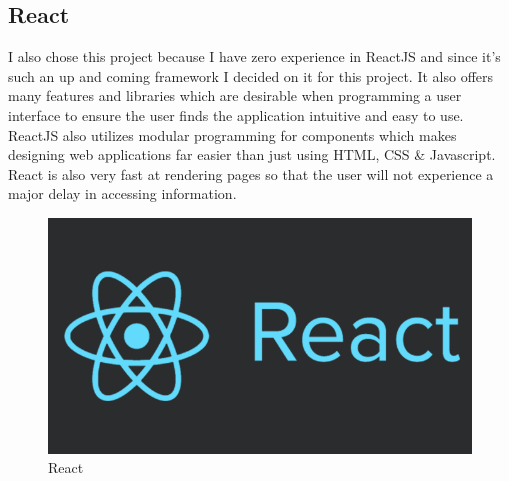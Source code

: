 \subsection{React}
I also chose this project because I have zero experience in ReactJS and since
it's such an up and coming framework I decided on it for this project. It also
offers many features and libraries which are desirable when programming a user
interface to ensure the user finds the application intuitive and easy to use.
ReactJS also utilizes modular programming for components which makes designing
web applications far easier than just using HTML, CSS \& Javascript. React is
also very fast at rendering pages so that the user will not experience a major
delay in accessing information.
\\
\begin{figure}[H]
  \includegraphics[width=\textwidth]{img/react.png}
  \caption{React}
  \label{fig: Image of React Logo}
\end{figure} \cite{ReactImage}
\\
